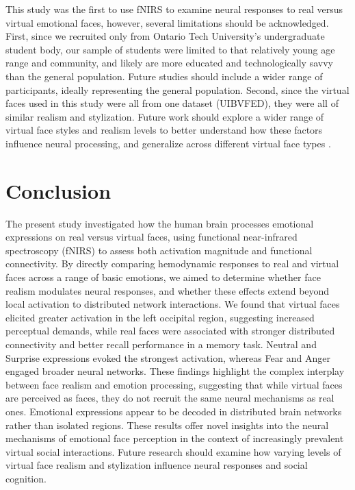 This study was the first to use fNIRS to examine neural responses to real versus virtual emotional faces, however, several limitations should be acknowledged.
First, since we recruited only from Ontario Tech University's undergraduate student body, our sample of students were limited to that relatively young age range and community, and likely are more educated and technologically savvy than the general population.
Future studies should include a wider range of participants, ideally representing the general population. 
Second, since the virtual faces used in this study were all from one dataset (UIBVFED), they were all of similar realism and stylization.
Future work should explore a wider range of virtual face styles and realism levels to better understand how these factors influence neural processing, and generalize across different virtual face types \citep{schindler_differential_2017}.

\section*{Conclusion}
The present study investigated how the human brain processes emotional expressions on real versus virtual faces, using functional near-infrared spectroscopy (fNIRS) to assess both activation magnitude and functional connectivity. 
By directly comparing hemodynamic responses to real and virtual faces across a range of basic emotions, we aimed to determine whether face realism modulates neural responses, and whether these effects extend beyond local activation to distributed network interactions. 
We found that virtual faces elicited greater activation in the left occipital region, suggesting increased perceptual demands, while real faces were associated with stronger distributed connectivity and better recall performance in a memory task. 
Neutral and Surprise expressions evoked the strongest activation, whereas Fear and Anger engaged broader neural networks. 
These findings highlight the complex interplay between face realism and emotion processing, suggesting that while virtual faces are perceived as faces, they do not recruit the same neural mechanisms as real ones. 
Emotional expressions appear to be decoded in distributed brain networks rather than isolated regions. 
These results offer novel insights into the neural mechanisms of emotional face perception in the context of increasingly prevalent virtual social interactions. 
Future research should examine how varying levels of virtual face realism and stylization influence neural responses and social cognition.